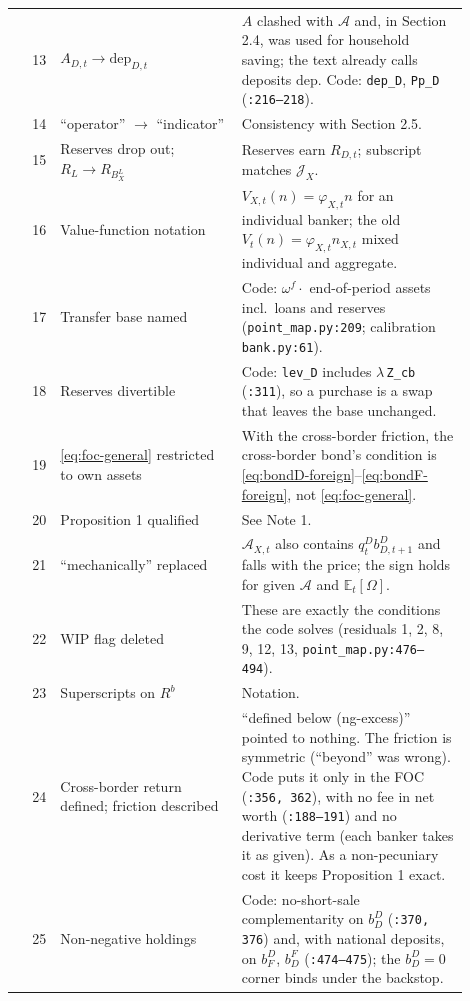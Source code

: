\documentclass[11pt]{article}
\newcommand{\E}{\mathbb{E}}
\begin{document}
\begin{longtable}{@{}r p{0.40\linewidth} p{0.50\linewidth}@{}}
13 & $A_{D,t}\to\mathrm{dep}_{D,t}$ & $A$ clashed with $\mathcal{A}$ and, in Section 2.4, was used for household saving; the text already calls deposits $\mathrm{dep}$. Code: \texttt{dep\_D}, \texttt{Pp\_D} (\texttt{:216--218}). \\
14 & ``operator'' $\to$ ``indicator'' & Consistency with Section 2.5. \\
15 & Reserves drop out; $R_{L}\to R_{B^L_X}$ & Reserves earn $R_{D,t}$; subscript matches $\mathcal{J}_X$. \\
16 & Value-function notation & $V_{X,t}(n)=\varphi_{X,t}n$ for an individual banker; the old $V_t(n)=\varphi_{X,t}n_{X,t}$ mixed individual and aggregate. \\
17 & Transfer base named & Code: $\omega^f\cdot$ end-of-period assets incl.\ loans and reserves (\texttt{point\_map.py:209}; calibration \texttt{bank.py:61}). \\
18 & Reserves divertible & Code: \texttt{lev\_D} includes $\lambda\,$\texttt{Z\_cb} (\texttt{:311}), so a purchase is a swap that leaves the base unchanged. \\
19 & \eqref{eq:foc-general} restricted to own assets & With the cross-border friction, the cross-border bond's condition is \eqref{eq:bondD-foreign}--\eqref{eq:bondF-foreign}, not \eqref{eq:foc-general}. \\
20 & Proposition 1 qualified & See Note 1. \\
21 & ``mechanically'' replaced & $\mathcal{A}_{X,t}$ also contains $q^D_t b^D_{D,t+1}$ and falls with the price; the sign holds for given $\mathcal{A}$ and $\E_t[\Omega]$. \\
22 & WIP flag deleted & These are exactly the conditions the code solves (residuals 1, 2, 8, 9, 12, 13, \texttt{point\_map.py:476--494}). \\
23 & Superscripts on $R^b$ & Notation. \\
24 & Cross-border return defined; friction described & ``defined below (ng-excess)'' pointed to nothing. The friction is symmetric (``beyond'' was wrong). Code puts it only in the FOC (\texttt{:356, 362}), with no fee in net worth (\texttt{:188--191}) and no derivative term (each banker takes it as given). As a non-pecuniary cost it keeps Proposition 1 exact. \\
25 & Non-negative holdings & Code: no-short-sale complementarity on $b^D_D$ (\texttt{:370, 376}) and, with national deposits, on $b^D_F$, $b^F_D$ (\texttt{:474--475}); the $b^D_D=0$ corner binds under the backstop. \\

\end{longtable}
\end{document}
